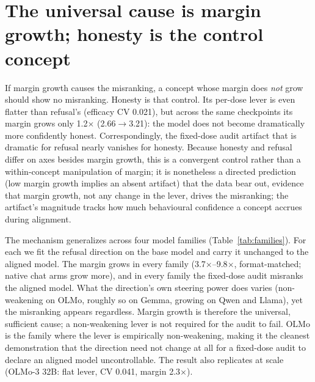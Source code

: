 \documentclass{article}
\newcommand{\x}{$\times$}
\begin{document}
\section{The universal cause is margin growth; honesty is the control concept}\label{sec:universal}
If margin growth causes the misranking, a concept whose margin does \emph{not} grow should show no
misranking. Honesty is that control. Its per-dose lever is even flatter than refusal's (efficacy CV
\num{0.021}), but across the same checkpoints its margin grows only \num{1.2}\x{}
(\num{2.66}$\rightarrow$\num{3.21}): the model does not become dramatically more confidently honest.
Correspondingly, the fixed-dose audit artifact that is dramatic for refusal nearly vanishes for
honesty. Because honesty and refusal differ on axes besides margin growth, this is a convergent control rather than a within-concept manipulation of margin; it is nonetheless a directed prediction (low margin growth implies an absent artifact) that the data bear out, evidence that margin growth, not any change in
the lever, drives the misranking; the artifact's magnitude tracks how much behavioural confidence a
concept accrues during alignment.

The mechanism generalizes across four model families (Table~\ref{tab:families}). For each we fit the
refusal direction on the base model and carry it unchanged to the aligned model. The margin grows in
every family (\num{3.7}\x--\num{9.8}\x, format-matched; native chat arms grow more), and in every
family the fixed-dose audit misranks the aligned model. What the direction's own steering power does
varies (non-weakening on OLMo, roughly so on Gemma, growing on Qwen and Llama), yet the misranking
appears regardless. Margin growth is therefore the universal, sufficient cause; a non-weakening lever is
not required for the audit to fail. OLMo is the family where the lever is empirically non-weakening, making
it the cleanest demonstration that the direction need not change at all for a fixed-dose audit to
declare an aligned model uncontrollable. The result also replicates at scale (OLMo-3 32B: flat
lever, CV \num{0.041}, margin \num{2.3}\x).
\end{document}
